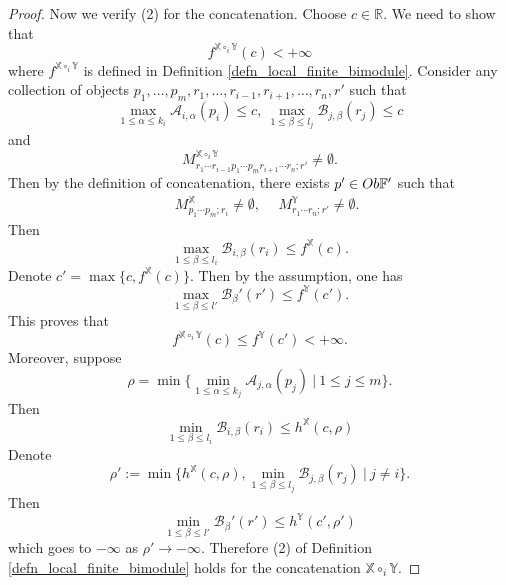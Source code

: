 \documentclass[10pt,a4paper]{amsart}
\newcommand{\beqn}{\begin{equation*}}
\newcommand{\eeqn}{\end{equation*}}
\newcommand{\mb}{\mathbb}
\newcommand{\mc}{\mathcal}
\begin{document}
\begin{proof}
Now we verify (2) for the concatenation. 
Choose $c \in {\mb R}$. We need to show that 
\beqn
f^{{\mb X} \circ_i {\mb Y}}(c) < +\infty
\eeqn
where $f^{{\mb X} \circ_i {\mb Y}}$ is defined in Definition \ref{defn_local_finite_bimodule}. Consider any collection of objects $p_1, \ldots, p_m, r_1, \ldots, r_{i-1}, r_{i+1}, \ldots, r_n, r'$ such that
\beqn
\max_{1 \leq \alpha \leq k_i} {\mc A}_{i, \alpha}(p_i) \leq c,\ \max_{1 \leq \beta \leq l_j} {\mc B}_{j, \beta}(r_j) \leq  c
\eeqn
and 
\beqn
M_{r_1 \cdots r_{i-1} p_1 \cdots p_m r_{i+1} \cdots r_n; r'}^{{\mb X} \circ_i {\mb Y}} \neq \emptyset.
\eeqn
Then by the definition of concatenation, there exists $p' \in {\rm Ob}{\mb F}'$ such that 
\begin{align*}
&\ M_{p_1 \cdots p_m; r_i}^{{\mb X}} \neq \emptyset,\ &\ M_{r_1 \cdots r_n; r'}^{{\mb Y}} \neq \emptyset.
\end{align*}
Then 
\beqn
\max_{1 \leq \beta \leq l_i} {\mc B}_{i, \beta}(r_i) \leq f^{\mb X}(c).
\eeqn
Denote $c' = \max \{ c, f^{\mb X}(c)\}$. Then by the assumption, one has 
\beqn
\max_{1 \leq \beta \leq l'} {\mc B}_\beta'(r') \leq f^{\mb Y}(c').
\eeqn
This proves that 
\beqn
f^{{\mb X} \circ_i {\mb Y}}(c) \leq f^{{\mb Y}}(c') < +\infty.
\eeqn
Moreover, suppose 
\beqn
\rho  = \min \Big\{ \min_{1 \leq \alpha \leq k_j} {\mc A}_{j, \alpha}(p_j)\ |\ 1 \leq j \leq m \Big\}.
\eeqn
Then 
\beqn
\min_{1 \leq \beta \leq l_i} {\mc B}_{i, \beta} (r_i) \leq h^{{\mb X}}(c, \rho)
\eeqn
Denote
\beqn
\rho':= \min \Big\{ h^{{\mb X}}(c, \rho), \min_{1 \leq \beta \leq l_j} {\mc B}_{j, \beta}(r_j)\ |\ j \neq i \Big\}.
\eeqn
Then 
\beqn
\min_{1 \leq \beta \leq l'} {\mc B}_\beta'(r') \leq h^{\mb Y}(c', \rho')
\eeqn
which goes to $-\infty$ as $\rho' \to -\infty$. Therefore (2) of Definition \ref{defn_local_finite_bimodule} holds for the concatenation ${\mb X} \circ_i {\mb Y}$.
\end{proof}
\end{document}
